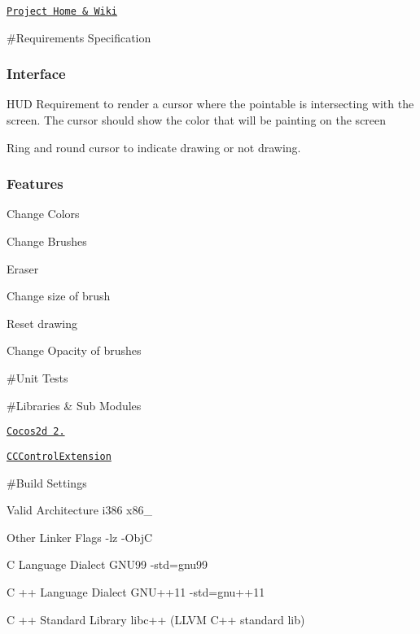 \href{http://hci.montclair.edu/groups/leap/}{\tt Project Home \& Wiki}

\#\-Requirements Specification

\subsubsection*{Interface}


\begin{DoxyItemize}
\item H\-U\-D Requirement to render a cursor where the pointable is intersecting with the screen. The cursor should show the color that will be painting on the screen
\item Ring and round cursor to indicate drawing or not drawing.
\end{DoxyItemize}

\subsubsection*{Features}


\begin{DoxyItemize}
\item Change Colors
\item Change Brushes
\item Eraser
\item Change size of brush
\item Reset drawing
\item Change Opacity of brushes
\end{DoxyItemize}

\#\-Unit Tests

\#\-Libraries \& Sub Modules


\begin{DoxyItemize}
\item \href{http://www.cocos2d-iphone.org/}{\tt Cocos2d 2.}
\item \href{https://github.com/YannickL/CCControlExtension}{\tt C\-C\-Control\-Extension}
\item \#\-Build Settings
\end{DoxyItemize}


\begin{DoxyItemize}
\item Valid Architecture i386 x86\-\_
\item Other Linker Flags -\/lz -\/\-Obj\-C
\item C Language Dialect G\-N\-U99 -\/std=gnu99
\item C ++ Language Dialect G\-N\-U++11 -\/std=gnu++11
\item C ++ Standard Library libc++ (L\-L\-V\-M C++ standard lib)
\end{DoxyItemize}


